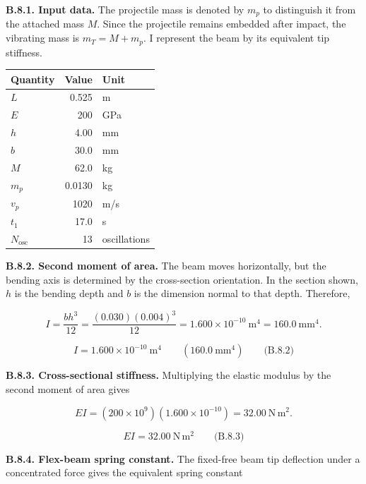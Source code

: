\begingroup
\setlength{\abovedisplayskip}{6pt}
\setlength{\belowdisplayskip}{6pt}
\setlength{\abovedisplayshortskip}{4pt}
\setlength{\belowdisplayshortskip}{4pt}
\setlength{\intextsep}{6pt}

\textbf{B.8.1. Input data.} The projectile mass is denoted by $m_p$ to distinguish it from the attached mass $M$. Since the projectile remains embedded after impact, the vibrating mass is $m_T=M+m_p$. I represent the beam by its equivalent tip stiffness.

{ %
\begin{center}\small\begin{tabular}{@{}lrl@{}}
\toprule\noalign{}
Quantity & Value & Unit \\
\midrule\noalign{}
$L$ & 0.525 & m \\
$E$ & 200 & GPa \\
$h$ & 4.00 & mm \\
$b$ & 30.0 & mm \\
$M$ & 62.0 & kg \\
$m_p$ & 0.0130 & kg \\
$v_p$ & 1020 & m/s \\
$t_1$ & 17.0 & s \\
$N_{\mathrm{osc}}$ & 13 & oscillations \\
\bottomrule\end{tabular}\end{center}
}

\textbf{B.8.2. Second moment of area.} The beam moves horizontally, but the bending axis is determined by the cross-section orientation. In the section shown, $h$ is the bending depth and $b$ is the dimension normal to that depth. Therefore,

\[
I=\frac{bh^3}{12}
 =\frac{(0.030)(0.004)^3}{12}
 =1.600\times10^{-10}\ \mathrm{m^4}
 =160.0\ \mathrm{mm^4}.
\]

\[
\boxed{I=1.600\times10^{-10}\ \mathrm{m^4}
\qquad\left(160.0\ \mathrm{mm^4}\right)}
\qquad\text{(B.8.2)}
\]

\textbf{B.8.3. Cross-sectional stiffness.} Multiplying the elastic modulus by the second moment of area gives

\[
EI=(200\times10^9)(1.600\times10^{-10})
 =32.00\ \mathrm{N\,m^2}.
\]

\[
\boxed{EI=32.00\ \mathrm{N\,m^2}}
\qquad\text{(B.8.3)}
\]

\textbf{B.8.4. Flex-beam spring constant.} The fixed-free beam tip deflection under a concentrated force gives the equivalent spring constant

